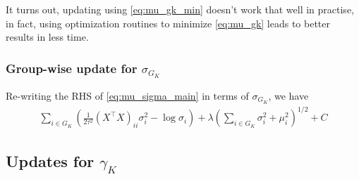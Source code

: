 \documentclass[12pt]{article}
\begin{document}
It turns out, updating using \eqref{eq:mu_gk_min} doesn't work that well in practise, in fact, using optimization routines to minimize \eqref{eq:mu_gk} leads to better results in less time.


\subsubsection{Group-wise update for $\sigma_{G_K}$}

Re-writing the RHS of \eqref{eq:mu_sigma_main} in terms of $\sigma_{G_K}$, we have
\begin{equation} \label{eq:sig_gk}
\begin{aligned}
    \sum_{i \in G_K} \left( 
    \frac{1}{2\tau^2} 
	    (X^\top X)_{ii} \sigma_i^2
-
    \log{\sigma_i}
    \right )
+
    \lambda \left( \sum_{i \in G_K} 
	\sigma_i^2 + \mu_i^2
    \right)^{1/2} + C
\end{aligned}
\end{equation}

\subsection{Updates for $\gamma_K$}
\end{document}
